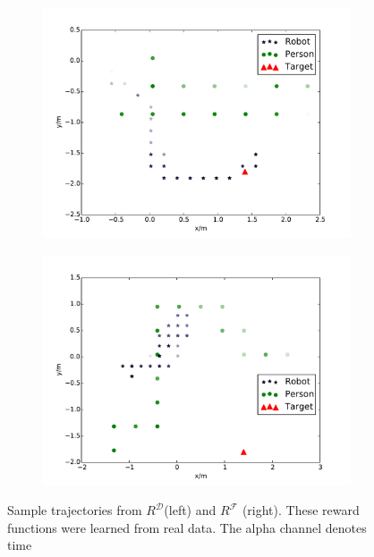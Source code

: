 \documentclass[letterpaper]{article}
\begin{document}
\begin{figure}[t]
  \hspace{-10pt}
  \begin{subfigure}{0.22\textwidth}
    \includegraphics[scale = 0.24]{images/gp.pdf}
    \label{fig:good_path}
  \end{subfigure}
  \hspace{15pt}
  \begin{subfigure}{0.22\textwidth}
    \includegraphics[scale = 0.24]{images/bp.pdf}
    \label{fig:bad_path}
\end{subfigure}
  \caption{\small{Sample trajectories from $R^\mathcal{D}$(left) and $R^\mathcal{F}$ (right). These reward functions were learned from real data. The alpha channel denotes time}}
  \label{fig:paths}
\vspace{-4mm}
\end{figure}
\end{document}
